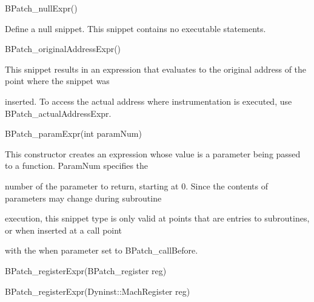 {{{{{{

BPatch_nullExpr()}



{

Define a null snippet. This snippet contains no executable statements.}





\bigskip



{

BPatch_originalAddressExpr()}



{

This snippet results in an expression that evaluates to the original address of the point where the snippet was

inserted. To access the actual address where instrumentation is executed, use BPatch_actualAddressExpr.}





\bigskip



{

BPatch_paramExpr(int paramNum)}



{

This constructor creates an expression whose value is a parameter being passed to a function. ParamNum specifies the

number of the parameter to return, starting at 0. Since the contents of parameters may change during subroutine

execution, this snippet type is only valid at points that are entries to subroutines, or when inserted at a call point

with the when parameter set to BPatch_callBefore.}





\bigskip



{

BPatch_registerExpr(BPatch_register reg)}



{

BPatch_registerExpr(Dyninst::MachRegister reg)}



{

}}}}}}
